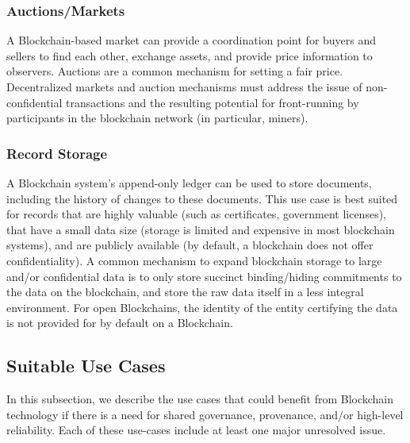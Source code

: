 \subsubsection{Auctions/Markets}
A Blockchain-based market can provide a coordination point for buyers and sellers to find each other, exchange assets, and provide price information to observers. 
Auctions are a common mechanism for setting a fair price. 
Decentralized markets and auction mechanisms must address the issue of non-confidential transactions and the resulting potential for front-running by participants in the blockchain network (in particular, miners).

\subsubsection{Record Storage} %
A Blockchain system's append-only ledger can be used to store documents, including the history of changes to these documents.
This use case is best suited for records that are highly valuable (such as certificates, government licenses), that have a small data size (storage is limited and expensive in most blockchain systems), and are publicly available (by default, a blockchain does not offer confidentiality).
A common mechanism to expand blockchain storage to large and/or confidential data is to only store succinct binding/hiding commitments to the data on the blockchain, and store the raw data itself in a less integral environment.
For open Blockchains, the identity of the entity certifying the data is not provided for by default on a Blockchain.


\subsection{Suitable Use Cases}
In this subsection, we describe the use cases that could benefit from Blockchain technology if there is a need for shared governance, provenance, and/or high-level reliability. Each of these use-cases include at least one major unresolved issue.

